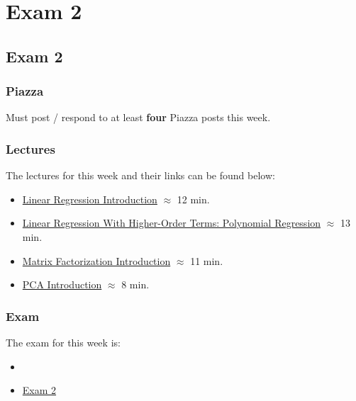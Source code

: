 \clearpage

\renewcommand{\ChapTitle}{Exam 2}
\renewcommand{\SectionTitle}{Exam 2}

\chapter{\ChapTitle}
\section{\SectionTitle}

\subsection{Piazza}

Must post / respond to at least \textbf{four} Piazza posts this week.  

\subsection{Lectures}

The lectures for this week and their links can be found below:

\begin{itemize}
    \item \href{https://applied.cs.colorado.edu/mod/hvp/view.php?id=52239}{Linear Regression Introduction} $\approx$ 12 min.
    \item \href{https://applied.cs.colorado.edu/mod/hvp/view.php?id=52240}{Linear Regression With Higher-Order Terms: Polynomial Regression} $\approx$ 13 min.
    \item \href{https://applied.cs.colorado.edu/mod/hvp/view.php?id=52242}{Matrix Factorization Introduction} $\approx$ 11 min.
    \item \href{https://applied.cs.colorado.edu/mod/hvp/view.php?id=52241}{PCA Introduction} $\approx$ 8 min.
\end{itemize}

\subsection{Exam}

The exam for this week is:

\begin{itemize}
    \item {}
    \item \href{https://applied.cs.colorado.edu/mod/quiz/view.php?id=50818}{Exam 2}  
\end{itemize}
